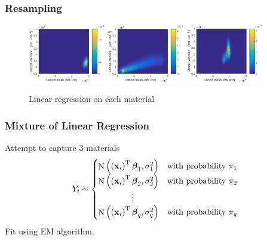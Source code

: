 \documentclass{beamer}
\DeclareMathOperator{\normal}{N}
\newcommand{\T}{^\textup{T}}
\newcommand{\vect}[1]{\mathbf{#1}}
\newcommand{\vectGreek}[1]{\boldsymbol{#1}}
\begin{document}
\begin{frame}
\frametitle{Resampling}
\begin{figure}
	\includegraphics[width = 0.3\textwidth]{figures/meanVar/subsample_background1.eps}
	\includegraphics[width = 0.3\textwidth]{figures/meanVar/subsample_sample1.eps}
	\includegraphics[width = 0.3\textwidth]{figures/meanVar/subsample_foam1.eps}
	\caption{Linear regression on each material}
\end{figure}
\end{frame}

\begin{frame}
\frametitle{Mixture of Linear Regression}
Attempt to capture 3 materials
\begin{equation}
Y_i\sim
\begin{cases}
\normal\left(\left(\vect{x}_i\right)\T\vectGreek{\beta}_1,\sigma_1^2\right) & \text{with probability }\pi_1\\ 
\normal\left(\left(\vect{x}_i\right)\T\vectGreek{\beta}_2,\sigma_2^2\right) & \text{with probability }\pi_2\\
\qquad\qquad\vdots\\
\normal\left(\left(\vect{x}_i\right)\T\vectGreek{\beta}_q,\sigma_q^2\right) & \text{with probability }\pi_q\\
\end{cases}
\end{equation}
Fit using EM algorithm.
\end{frame}
\end{document}
